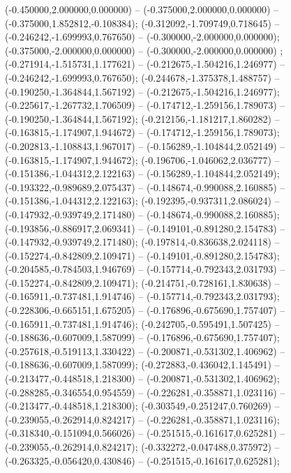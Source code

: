  (-0.450000,2.000000,0.000000) -- (-0.375000,2.000000,0.000000) -- (-0.375000,1.852812,-0.108384);
 (-0.312092,-1.709749,0.718645) -- (-0.246242,-1.699993,0.767650) -- (-0.300000,-2.000000,0.000000);
 (-0.375000,-2.000000,0.000000) -- (-0.300000,-2.000000,0.000000) ;
 (-0.271914,-1.515731,1.177621) -- (-0.212675,-1.504216,1.246977) -- (-0.246242,-1.699993,0.767650);
 (-0.244678,-1.375378,1.488757) -- (-0.190250,-1.364844,1.567192) -- (-0.212675,-1.504216,1.246977);
 (-0.225617,-1.267732,1.706509) -- (-0.174712,-1.259156,1.789073) -- (-0.190250,-1.364844,1.567192);
 (-0.212156,-1.181217,1.860282) -- (-0.163815,-1.174907,1.944672) -- (-0.174712,-1.259156,1.789073);
 (-0.202813,-1.108843,1.967017) -- (-0.156289,-1.104844,2.052149) -- (-0.163815,-1.174907,1.944672);
 (-0.196706,-1.046062,2.036777) -- (-0.151386,-1.044312,2.122163) -- (-0.156289,-1.104844,2.052149);
 (-0.193322,-0.989689,2.075437) -- (-0.148674,-0.990088,2.160885) -- (-0.151386,-1.044312,2.122163);
 (-0.192395,-0.937311,2.086024) -- (-0.147932,-0.939749,2.171480) -- (-0.148674,-0.990088,2.160885);
 (-0.193856,-0.886917,2.069341) -- (-0.149101,-0.891280,2.154783) -- (-0.147932,-0.939749,2.171480);
 (-0.197814,-0.836638,2.024118) -- (-0.152274,-0.842809,2.109471) -- (-0.149101,-0.891280,2.154783);
 (-0.204585,-0.784503,1.946769) -- (-0.157714,-0.792343,2.031793) -- (-0.152274,-0.842809,2.109471);
 (-0.214751,-0.728161,1.830638) -- (-0.165911,-0.737481,1.914746) -- (-0.157714,-0.792343,2.031793);
 (-0.228306,-0.665151,1.675205) -- (-0.176896,-0.675690,1.757407) -- (-0.165911,-0.737481,1.914746);
 (-0.242705,-0.595491,1.507425) -- (-0.188636,-0.607009,1.587099) -- (-0.176896,-0.675690,1.757407);
 (-0.257618,-0.519113,1.330422) -- (-0.200871,-0.531302,1.406962) -- (-0.188636,-0.607009,1.587099);
 (-0.272883,-0.436042,1.145491) -- (-0.213477,-0.448518,1.218300) -- (-0.200871,-0.531302,1.406962);
 (-0.288285,-0.346554,0.954559) -- (-0.226281,-0.358871,1.023116) -- (-0.213477,-0.448518,1.218300);
 (-0.303549,-0.251247,0.760269) -- (-0.239055,-0.262914,0.824217) -- (-0.226281,-0.358871,1.023116);
 (-0.318340,-0.151094,0.566026) -- (-0.251515,-0.161617,0.625281) -- (-0.239055,-0.262914,0.824217);
 (-0.332272,-0.047488,0.375972) -- (-0.263325,-0.056420,0.430846) -- (-0.251515,-0.161617,0.625281);
